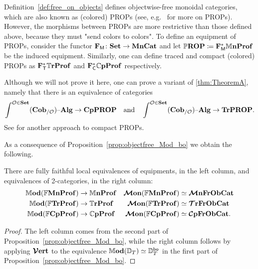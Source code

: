 \documentclass[11pt,oneside,article]{memoir}
\begin{document}
\begin{remark}
    \label{rem:PROP}
  Definition~\ref{def:free_on_objects} defines objectwise-free monoidal categories, which are also
  known as (colored) PROPs (see, e.g.\ \cite{HackneyRobertson} for more on PROPs). However, the
  morphisms between PROPs are more restrictive than those defined above, because they must "send
  colors to colors". To define an equipment of PROPs, consider the functor $\mathbf{F}_{\mathsf{M}}\colon\mathbf{Set}\to\mathbf{MnCat}$
  and let $\mathbb{P}\mathbf{ROP}\coloneqq\mathbf{F}_{\mathsf{M}}^*\mathbb{M}\mathbf{nProf}$ be the induced equipment. Similarly, one can define traced
  and compact (colored) PROPs as $\mathbf{F}_{\mathsf{T}}^*\mathbb{T}\mathbf{rProf}$ and $\mathbf{F}_{\mathsf{C}}^*\mathbb{C}\mathbf{pProf}$ respectively.

  Although we will not prove it here, one can prove a variant of \ref{thm:TheoremA}, namely that
  there is an equivalence of categories
  \begin{equation*}
    \int^{\mathcal{O}\in\mathbf{Set}}(\mathbf{Cob}_{/\mathcal{O}}){\text \textendash}\mathbf{Alg} \to \mathbf{CpPROP}
    \quad\text{and}\quad
    \int^{\mathcal{O}\in\mathbf{Set}}(\mathbf{Cob}_{/\mathcal{O}}){\text \textendash}\mathbf{Alg} \to \mathbf{TrPROP}.
  \end{equation*}
  See \cite{JoyalKock} for another approach to compact PROPs.
\end{remark}

As a consequence of Proposition~\ref{prop:objectfree_Mod_bo} we obtain the following.

\begin{corollary}
    \label{cor:TrCat_ObjectFree}
  There are fully faithful local equivalences of equipments, in the left column, and equivalences of
  2-categories, in the right column:
  \begin{align*}
    \mathbb{M}\mathbf{od}(\mathbb{F}\mathbf{MnProf})  &\to \mathbb{M}\mathbf{nProf} &\bm{\mathcal{M}}\mathbf{on}(\mathbb{F}\mathbf{MnProf})&\simeq\bm{\mathcal{M}}\mathbf{nFrObCat}\\
    \mathbb{M}\mathbf{od}(\mathbb{F}\mathbf{TrProf})   &\to \mathbb{T}\mathbf{rProf}  &\bm{\mathcal{M}}\mathbf{on}(\mathbb{F}\mathbf{TrProf})&\simeq\bm{\mathcal{T}}\mathbf{rFrObCat}\\
    \mathbb{M}\mathbf{od}(\mathbb{F}\mathbf{CpProf}) &\to \mathbb{C}\mathbf{pProf} &\bm{\mathcal{M}}\mathbf{on}(\mathbb{F}\mathbf{CpProf})&\simeq\bm{\mathcal{C}}\mathbf{pFrObCat}.
  \end{align*}
\end{corollary}
\begin{proof}
  The left column comes from the second part of Proposition~\ref{prop:objectfree_Mod_bo}, while the
  right column follows by applying $\bm{\mathcal{V}}\mathbf{ert}$ to the equivalence
  $\mathbb{M}\mathbf{od}(\mathbb{D}_T)\simeq\mathbb{D}_T^{\mathsf{bo}}$ in the first part of
  Proposition~\ref{prop:objectfree_Mod_bo}.
\end{proof}
\end{document}
